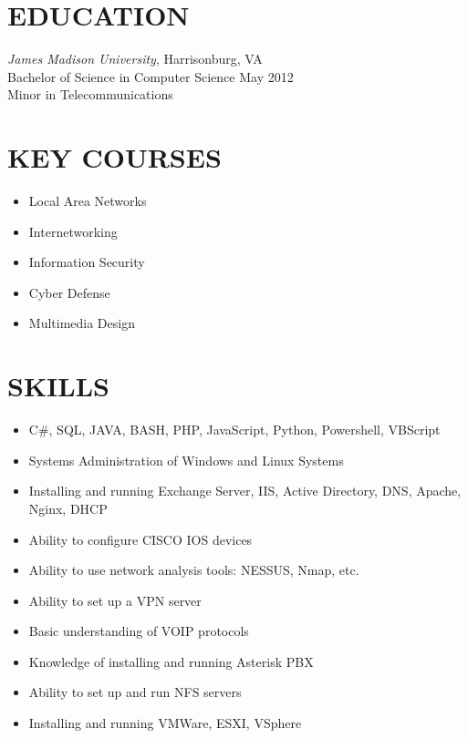 \documentclass[line, margin]{res}
\begin{document}
\address{1604 Swinton Ln\\ Henrico, VA 23238\\ (804) 543-0554\\ michael@harpelife.com} 
 
\begin{resume}

\section{EDUCATION} 
 \textit {James Madison University}, Harrisonburg, VA \\
 Bachelor of Science in Computer Science \hfill May 2012\\
 Minor in Telecommunications \\

\section{KEY COURSES}

\begin{itemize}[itemsep=2pt,leftmargin=10pt]
\item Local Area Networks 
\item Internetworking 
\item Information Security 
\item Cyber Defense 
\item Multimedia Design
\end{itemize}


\section{SKILLS}
\begin{itemize}[leftmargin=10pt]
\item C\#, SQL, JAVA, BASH, PHP, JavaScript, Python, Powershell, VBScript
\item Systems Administration of Windows and Linux Systems
\item Installing and running Exchange Server, IIS, Active Directory, DNS, Apache, Nginx, DHCP
\item Ability to configure CISCO IOS devices
\item Ability to use network analysis tools: NESSUS, Nmap, etc.
\item Ability to set up a VPN server
\item Basic understanding of VOIP protocols
\item Knowledge of installing and running Asterisk PBX
\item Ability to set up and run NFS servers
\item Installing and running VMWare, ESXI, VSphere
\end{itemize}


\end{resume}
\end{document}
